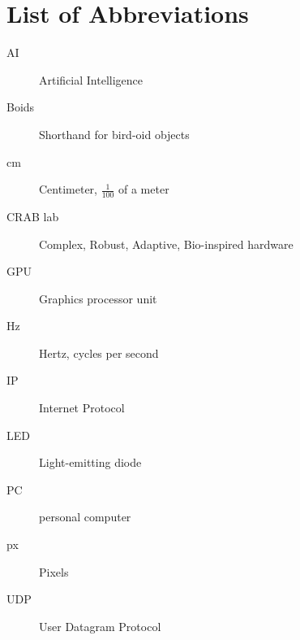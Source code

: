 \chapter{List of Abbreviations}

\begin{description}
  \item[AI] Artificial Intelligence
  \item[Boids] Shorthand for bird-oid objects
  \item[cm] Centimeter, $\frac{1}{100}$ of a meter
  \item[CRAB lab] Complex, Robust, Adaptive, Bio-inspired hardware
  \item[GPU] Graphics processor unit
  \item[Hz] Hertz, cycles per second
  \item[IP] Internet Protocol
  \item[LED] Light-emitting diode
  \item [PC] personal computer
  \item[px] Pixels
  \item[UDP] User Datagram Protocol
\end{description}
